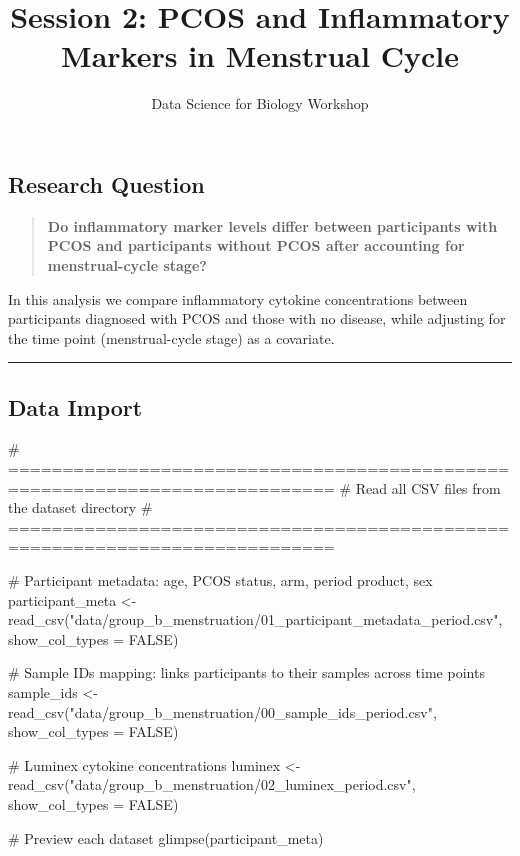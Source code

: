 \documentclass[
  letterpaper,
  DIV=11,
  numbers=noendperiod]{scrartcl}
\title{Session 2: PCOS and Inflammatory Markers in Menstrual Cycle}
\author{Data Science for Biology Workshop}
\date{}
\newenvironment{Shaded}{\begin{snugshade}}{\end{snugshade}}
\newcommand{\AttributeTok}[1]{\textcolor[rgb]{0.40,0.45,0.13}{#1}}
\newcommand{\CommentTok}[1]{\textcolor[rgb]{0.37,0.37,0.37}{#1}}
\newcommand{\ConstantTok}[1]{\textcolor[rgb]{0.56,0.35,0.01}{#1}}
\newcommand{\FunctionTok}[1]{\textcolor[rgb]{0.28,0.35,0.67}{#1}}
\newcommand{\NormalTok}[1]{\textcolor[rgb]{0.00,0.23,0.31}{#1}}
\newcommand{\OtherTok}[1]{\textcolor[rgb]{0.00,0.23,0.31}{#1}}
\newcommand{\StringTok}[1]{\textcolor[rgb]{0.13,0.47,0.30}{#1}}
\renewcommand*\contentsname{Table of contents}
\newcommand\contentsname{Table of contents}
\begin{document}
\maketitle

\renewcommand*\contentsname{Table of contents}
{
\setcounter{tocdepth}{3}
\tableofcontents
}

\subsection{Research Question}\label{research-question}

\begin{quote}
\textbf{Do inflammatory marker levels differ between participants with
PCOS and participants without PCOS after accounting for menstrual-cycle
stage?}
\end{quote}

In this analysis we compare inflammatory cytokine concentrations between
participants diagnosed with PCOS and those with no disease, while
adjusting for the time point (menstrual-cycle stage) as a covariate.

\begin{center}\rule{0.5\linewidth}{0.5pt}\end{center}

\subsection{Data Import}\label{data-import}

\begin{Shaded}
\begin{Highlighting}[]
\CommentTok{\# ============================================================================}
\CommentTok{\# Read all CSV files from the dataset directory}
\CommentTok{\# ============================================================================}

\CommentTok{\# Participant metadata: age, PCOS status, arm, period product, sex}
\NormalTok{participant\_meta }\OtherTok{\textless{}{-}} \FunctionTok{read\_csv}\NormalTok{(}\StringTok{"data/group\_b\_menstruation/01\_participant\_metadata\_period.csv"}\NormalTok{,}
                             \AttributeTok{show\_col\_types =} \ConstantTok{FALSE}\NormalTok{)}

\CommentTok{\# Sample IDs mapping: links participants to their samples across time points}
\NormalTok{sample\_ids }\OtherTok{\textless{}{-}} \FunctionTok{read\_csv}\NormalTok{(}\StringTok{"data/group\_b\_menstruation/00\_sample\_ids\_period.csv"}\NormalTok{,}
                       \AttributeTok{show\_col\_types =} \ConstantTok{FALSE}\NormalTok{)}

\CommentTok{\# Luminex cytokine concentrations}
\NormalTok{luminex }\OtherTok{\textless{}{-}} \FunctionTok{read\_csv}\NormalTok{(}\StringTok{"data/group\_b\_menstruation/02\_luminex\_period.csv"}\NormalTok{,}
                    \AttributeTok{show\_col\_types =} \ConstantTok{FALSE}\NormalTok{)}

\CommentTok{\# Preview each dataset}
\FunctionTok{glimpse}\NormalTok{(participant\_meta)}
\end{Highlighting}
\end{Shaded}
\end{document}
